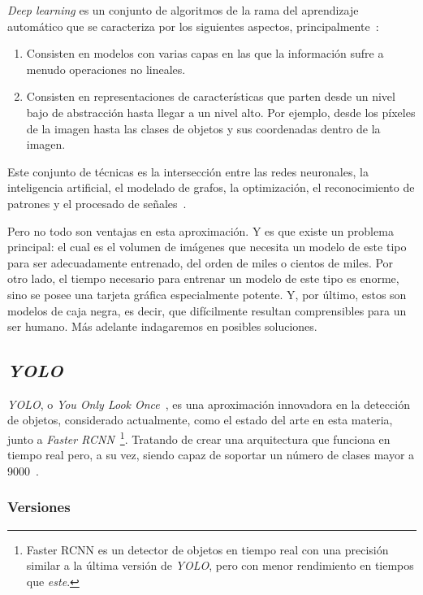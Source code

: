 \textit{Deep learning} es un conjunto de algoritmos de la rama del aprendizaje automático que se caracteriza por los siguientes aspectos, principalmente~\cite{ms:deeplearning}:

\begin{enumerate}
	\item Consisten en modelos con varias capas en las que la información sufre a menudo operaciones no lineales.
	\item Consisten en representaciones de características que parten desde un nivel bajo de abstracción hasta llegar a un nivel alto. Por ejemplo, desde los píxeles de la imagen hasta las clases de objetos y sus coordenadas dentro de la imagen.
\end{enumerate}

Este conjunto de técnicas es la intersección entre las redes neuronales, la inteligencia artificial, el modelado de grafos, la optimización, el reconocimiento de patrones y el procesado de señales~\cite{ms:deeplearning}. %

Pero no todo son ventajas en esta aproximación. Y es que existe un problema principal: el cual es el volumen de imágenes que necesita un modelo de este tipo para ser adecuadamente entrenado, del orden de miles o cientos de miles. Por otro lado, el tiempo necesario para entrenar un modelo de este tipo es enorme, sino se posee una tarjeta gráfica especialmente potente. Y, por último, estos son modelos de caja negra, es decir, que difícilmente resultan comprensibles para un ser humano. Más adelante indagaremos en posibles soluciones.

\subsection{\textit{YOLO}}

\textit{YOLO}, o \textit{You Only Look Once}~\cite{yolo}, es una aproximación innovadora en la detección de objetos, considerado actualmente, como el estado del arte en esta materia, junto a \textit{Faster RCNN}~\cite{faster-rcnn}\footnote{Faster RCNN es un detector de objetos en tiempo real con una precisión similar a la última versión de \textit{YOLO}, pero con menor rendimiento en tiempos que \textit{este}.}. Tratando de crear una arquitectura que funciona en tiempo real pero, a su vez, siendo capaz de soportar un número de clases mayor a 9000~\cite{yolov2}.

\subsubsection{Versiones}


